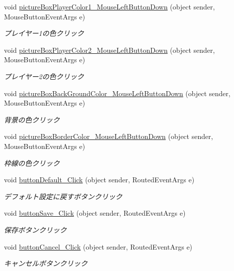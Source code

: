 \begin{DoxyCompactItemize}
\item 
void \hyperlink{class_reversi4color_wpf_1_1_setting_window_aeb017c6106fd3bd79083e1326623ef8b}{picture\+Box\+Player\+Color1\+\_\+\+Mouse\+Left\+Button\+Down} (object sender, Mouse\+Button\+Event\+Args e)
\begin{DoxyCompactList}\small\item\em プレイヤー1の色クリック \end{DoxyCompactList}\item 
void \hyperlink{class_reversi4color_wpf_1_1_setting_window_a19ec10790a7c71407fc0a67faf97978e}{picture\+Box\+Player\+Color2\+\_\+\+Mouse\+Left\+Button\+Down} (object sender, Mouse\+Button\+Event\+Args e)
\begin{DoxyCompactList}\small\item\em プレイヤー2の色クリック \end{DoxyCompactList}\item 
void \hyperlink{class_reversi4color_wpf_1_1_setting_window_a40fbee94e6f54854efe0e29d2e4252fb}{picture\+Box\+Back\+Ground\+Color\+\_\+\+Mouse\+Left\+Button\+Down} (object sender, Mouse\+Button\+Event\+Args e)
\begin{DoxyCompactList}\small\item\em 背景の色クリック \end{DoxyCompactList}\item 
void \hyperlink{class_reversi4color_wpf_1_1_setting_window_a22a2d7abed12e8360eb1b85f5af92268}{picture\+Box\+Border\+Color\+\_\+\+Mouse\+Left\+Button\+Down} (object sender, Mouse\+Button\+Event\+Args e)
\begin{DoxyCompactList}\small\item\em 枠線の色クリック \end{DoxyCompactList}\item 
void \hyperlink{class_reversi4color_wpf_1_1_setting_window_af2d7e447926127521d276807776c7bf0}{button\+Default\+\_\+\+Click} (object sender, Routed\+Event\+Args e)
\begin{DoxyCompactList}\small\item\em デフォルト設定に戻すボタンクリック \end{DoxyCompactList}\item 
void \hyperlink{class_reversi4color_wpf_1_1_setting_window_a6a6a1a2fd61463026678b72dabaf7729}{button\+Save\+\_\+\+Click} (object sender, Routed\+Event\+Args e)
\begin{DoxyCompactList}\small\item\em 保存ボタンクリック \end{DoxyCompactList}\item 
void \hyperlink{class_reversi4color_wpf_1_1_setting_window_afbcd7dd27bd8a753ef2d9f991880db6b}{button\+Cancel\+\_\+\+Click} (object sender, Routed\+Event\+Args e)
\begin{DoxyCompactList}\small\item\em キャンセルボタンクリック \end{DoxyCompactList}\end{DoxyCompactItemize}
